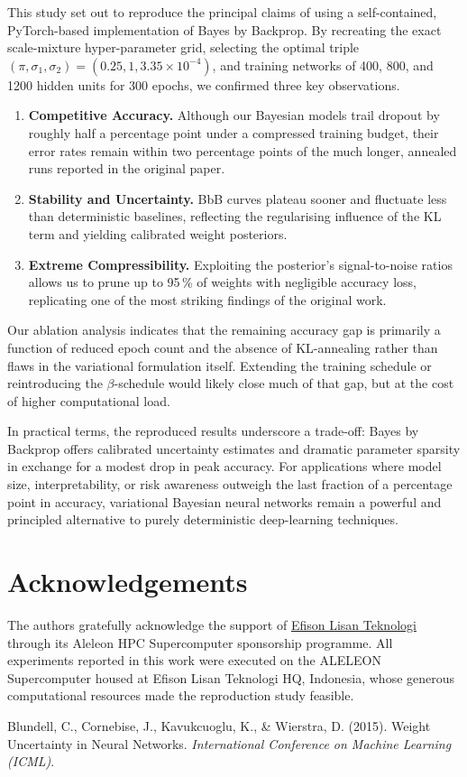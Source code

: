 \documentclass{article}
\begin{document}
This study set out to reproduce the principal claims of \citet{blundell2015weight} using a self-contained, PyTorch-based implementation of Bayes by Backprop.  
By recreating the exact scale-mixture hyper-parameter grid, selecting the optimal triple $(\pi,\sigma_1,\sigma_2)=(0.25,1,3.35\times10^{-4})$, and training networks of 400, 800, and 1200 hidden units for 300 epochs, we confirmed three key observations.  

\begin{enumerate}
\item \textbf{Competitive Accuracy.}  Although our Bayesian models trail dropout by roughly half a percentage point under a compressed training budget, their error rates remain within two percentage points of the much longer, annealed runs reported in the original paper.  
\item \textbf{Stability and Uncertainty.}  BbB curves plateau sooner and fluctuate less than deterministic baselines, reflecting the regularising influence of the KL term and yielding calibrated weight posteriors.  
\item \textbf{Extreme Compressibility.}  Exploiting the posterior’s signal-to-noise ratios allows us to prune up to 95\,\% of weights with negligible accuracy loss, replicating one of the most striking findings of the original work.  
\end{enumerate}

Our ablation analysis indicates that the remaining accuracy gap is primarily a function of reduced epoch count and the absence of KL-annealing rather than flaws in the variational formulation itself.  Extending the training schedule or reintroducing the $\beta$-schedule would likely close much of that gap, but at the cost of higher computational load.

In practical terms, the reproduced results underscore a trade-off: Bayes by Backprop offers calibrated uncertainty estimates and dramatic parameter sparsity in exchange for a modest drop in peak accuracy.  For applications where model size, interpretability, or risk awareness outweigh the last fraction of a percentage point in accuracy, variational Bayesian neural networks remain a powerful and principled alternative to purely deterministic deep-learning techniques.
\section*{Acknowledgements}

The authors gratefully acknowledge the support of \href{https://efisonlt.com}{Efison Lisan Teknologi} through its Aleleon HPC Supercomputer sponsorship programme.  All experiments reported in this work were executed on the ALELEON Supercomputer housed at Efison Lisan Teknologi HQ, Indonesia, whose generous computational resources made the reproduction study feasible.

\begin{thebibliography}{9}
Blundell, C., Cornebise, J., Kavukcuoglu, K., \& Wierstra, D. (2015). Weight Uncertainty in Neural Networks. \textit{International Conference on Machine Learning (ICML)}.
\end{thebibliography}
\end{document}
